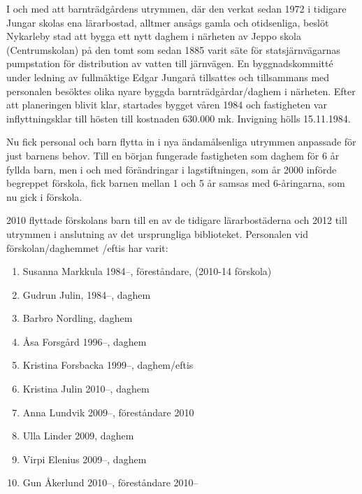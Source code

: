 
I och med att barnträdgårdens utrymmen, där den verkat sedan 1972 i tidigare Jungar skolas ena lärarbostad, alltmer ansågs gamla och otidsenliga, beslöt Nykarleby stad att bygga ett nytt daghem i närheten av Jeppo skola (Centrumskolan) på den tomt som sedan 1885 varit säte för statsjärnvägarnas pumpstation för distribution av vatten till järnvägen. En byggnadskommitté under ledning av fullmäktige Edgar Jungarå tillsattes och tillsammans med personalen besöktes olika nyare byggda barnträdgårdar/daghem i närheten. Efter att planeringen  blivit klar, startades bygget våren 1984 och fastigheten var inflyttningsklar till hösten till kostnaden 630.000 mk. Invigning hölls 15.11.1984.

Nu fick personal och barn flytta in i nya ändamålsenliga utrymmen anpassade för just barnens behov. Till en början fungerade fastigheten  som daghem för 6 år fyllda barn, men i och med förändringar i lagstiftningen, som år 2000 införde begreppet förskola, fick barnen mellan 1 och 5 år samsas med 6-åringarna, som nu gick i förskola.

2010 flyttade förskolans barn till en av de tidigare lärarbostäderna och 2012 till utrymmen i anslutning av det ursprungliga biblioteket. Personalen vid förskolan/daghemmet /eftis har varit:
\begin{enumerate}
  \item Susanna Markkula 1984--, föreståndare, (2010-14 förskola)
  \item Gudrun Julin, 1984--, daghem
  \item Barbro Nordling, daghem
  \item Åsa Forsgård 1996--, daghem
  \item Kristina Forsbacka 1999--, daghem/eftis
  \item Kristina Julin 2010--, daghem
  \item Anna Lundvik 2009--, föreståndare 2010
  \item Ulla Linder 2009, daghem
  \item Virpi Elenius 2009--, daghem
  \item Gun Åkerlund 2010--, föreståndare 2010--
\end{enumerate}





